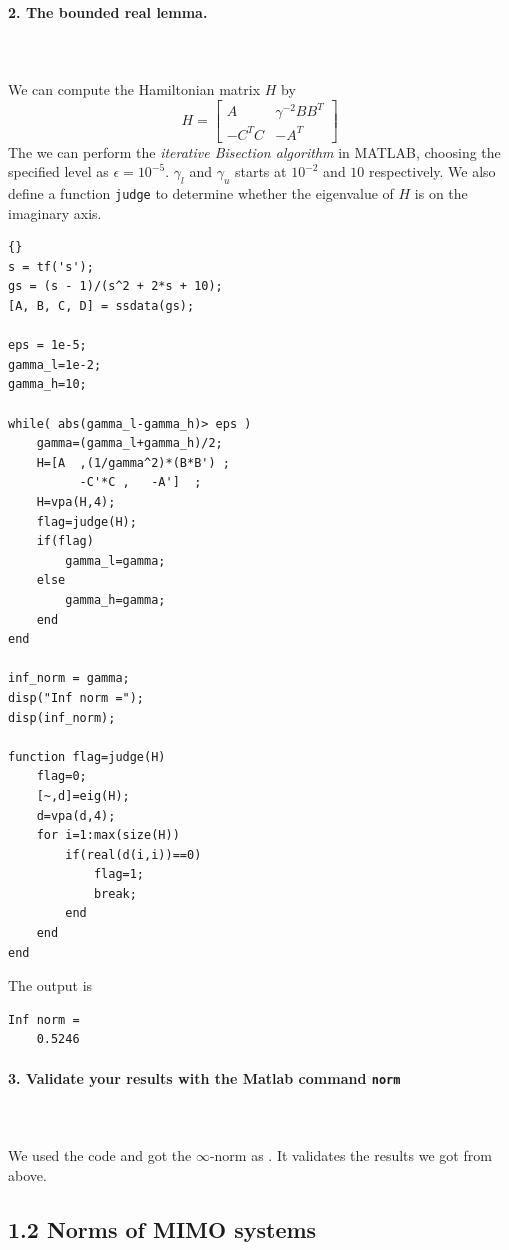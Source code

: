 \documentclass{article}
\begin{document}
\paragraph{2. The bounded real lemma.}~\\~\\
We can compute the Hamiltonian matrix $H$ by 
\[ H = \begin{bmatrix} 
A & \gamma^{-2}BB^T \\ -C^TC & -A^T
\end{bmatrix} 
\]
The we can perform the \textit{iterative Bisection algorithm} in MATLAB, choosing the specified level as $\epsilon=10^{-5}$. $\gamma_l$ and $\gamma_u$ starts at $10^{-2}$ and $10$ respectively. We also define a function \verb|judge| to determine whether the eigenvalue of $H$ is on the imaginary axis.
\begin{lstlisting}{}
s = tf('s');
gs = (s - 1)/(s^2 + 2*s + 10);
[A, B, C, D] = ssdata(gs);

eps = 1e-5;
gamma_l=1e-2; 
gamma_h=10;

while( abs(gamma_l-gamma_h)> eps )
    gamma=(gamma_l+gamma_h)/2;
    H=[A  ,(1/gamma^2)*(B*B') ;
          -C'*C ,   -A']  ;
    H=vpa(H,4);
    flag=judge(H);
    if(flag)  
        gamma_l=gamma;
    else
        gamma_h=gamma;
    end
end

inf_norm = gamma;
disp("Inf norm =");
disp(inf_norm);

function flag=judge(H)
    flag=0;
    [~,d]=eig(H); 
    d=vpa(d,4);
    for i=1:max(size(H))
        if(real(d(i,i))==0) 
            flag=1;
            break;
        end
    end
end
\end{lstlisting}
The output is 
\begin{lstlisting}[numbers=none]
Inf norm =
    0.5246
\end{lstlisting}

\paragraph{3. Validate your results with the Matlab command \texttt{norm} }~\\~\\
We used the code  and got the $\infty$-norm as . It validates the results we got from above.

\subsection*{1.2 Norms of MIMO systems}
\end{document}
